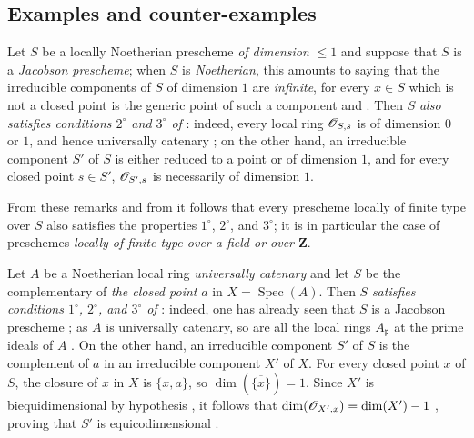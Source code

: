 \subsection{Examples and counter-examples}
\label{subsection:IV.10.7}

\begin{env}[10.7.1]
\label{IV.10.7.1}
Let $S$ be a locally Noetherian prescheme \emph{of dimension} $\leq 1$ and suppose that $S$ is a \emph{Jacobson prescheme}; when $S$ is \emph{Noetherian}, this amounts to saying that the irreducible components of $S$ of dimension $1$ are \emph{infinite}, for every $x\in S$ which is not a closed point is the generic point of such a component  and .
Then $S$ \emph{also satisfies conditions $2^\circ$ and $3^\circ$ of} : indeed, every local ring $\mathscr{O}_{S,s}$ is of dimension $0$ or $1$, and hence universally catenary ; on the other hand, an irreducible component $S'$ of $S$ is either reduced
to a point or of dimension $1$, and for every closed point $s\in S'$, $\mathscr{O}_{S',s}$ is necessarily of dimension $1$.

From these remarks and from  it follows that every prescheme locally of finite type over $S$ also satisfies the properties $1^\circ$, $2^\circ$, and $3^\circ$; it is in particular the case of preschemes \emph{locally of finite type over a field or over $\mathbf{Z}$}.
\end{env}

\begin{env}[10.7.2]
\label{IV.10.7.2}
Let $A$ be a Noetherian local ring \emph{universally catenary} and let $S$ be the complementary of \emph{the closed point} $a$ in $X=\operatorname{Spec}(A)$.
Then $S$ \emph{satisfies conditions $1^\circ$, $2^\circ$, and $3^\circ$ of} : indeed, one has already seen that $S$ is a Jacobson prescheme ; as $A$ is universally catenary, so are all the local rings $A_\mathfrak{p}$ at the prime ideals of $A$ .
On the other hand, an irreducible component $S'$ of $S$ is the complement of $a$ in an irreducible component $X'$ of $X$. For every closed point $x$ of $S$, the closure of $x$ in $X$ is $\{x,a\}$, so $\dim(\overline{\{x\}})=1$. Since $X'$ is biequidimensional by hypothesis , it follows that $\dim(\mathscr{O}_{X',x})=\dim(X')-1$ , proving that $S'$ is equicodimensional .
\end{env}


